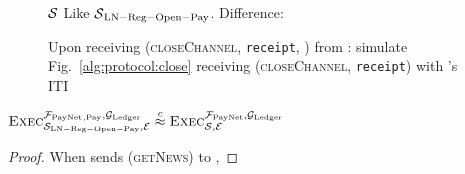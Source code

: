 \begin{figure}[H]
  \begin{simulatorbox}{$\mathcal{S}$}
    Like $\mathcal{S}{}_{\mathrm{LN - Reg - Open - Pay}}$. Difference:
    \begin{algorithmic}[1]
      \State Upon receiving (\textsc{closeChannel}, \texttt{receipt}, \alice)
      from \fpaynet:
      \Indent
        \State simulate Fig.~\ref{alg:protocol:close} receiving
        (\textsc{closeChannel}, \texttt{receipt}) with \alice's ITI
        \label{alg:sim:close}
      \EndIndent
    \end{algorithmic}
  \end{simulatorbox}
  \caption{}
  \label{alg:sim:close}
\end{figure}

\begin{lemma}
  \label{lemma:close}
  $\textsc{Exec}^{\mathcal{F}_{\mathrm{PayNet}}{}_{\mathrm{, Pay}}, \mathcal{G}_{\mathrm{Ledger}}}_{\mathcal{S}_{\mathrm{LN
  - Reg - Open - Pay}}, \mathcal{E}} \overset{c}{\approx}
  \textsc{Exec}^{\mathcal{F}_{\mathrm{PayNet}}, \mathcal{G}_{\mathrm{Ledger}}}_{\mathcal{S}, \mathcal{E}}$
\end{lemma}

\begin{proof}
  When \environment{} sends (\textsc{getNews}) to \alice,
\end{proof}
